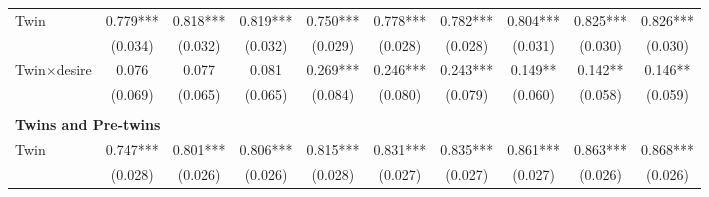 \begin{landscape}
\begin{table}[htpb!]
\begin{center}
\begin{tabular}{lccccccccc}
Twin&0.779***&0.818***&0.819***&0.750***&0.778***&0.782***&0.804***&0.825***&0.826***\\
&(0.034)&(0.032)&(0.032)&(0.029)&(0.028)&(0.028)&(0.031)&(0.030)&(0.030)\\
Twin$\times$desire&0.076&0.077&0.081&0.269***&0.246***&0.243***&0.149**&0.142**&0.146**\\
&(0.069)&(0.065)&(0.065)&(0.084)&(0.080)&(0.079)&(0.060)&(0.058)&(0.059)\\
\begin{footnotesize}\end{footnotesize}&\begin{footnotesize}\end{footnotesize}&\begin{footnotesize}\end{footnotesize}&\begin{footnotesize}\end{footnotesize}&\begin{footnotesize}\end{footnotesize}&\begin{footnotesize}\end{footnotesize}&\begin{footnotesize}\end{footnotesize}&\begin{footnotesize}\end{footnotesize}&\begin{footnotesize}\end{footnotesize}&\begin{footnotesize}\end{footnotesize}\\\multicolumn{10}{l}{\textbf{Twins and Pre-twins}}\\ 
Twin&0.747***&0.801***&0.806***&0.815***&0.831***&0.835***&0.861***&0.863***&0.868***\\
&(0.028)&(0.026)&(0.026)&(0.028)&(0.027)&(0.027)&(0.027)&(0.026)&(0.026)\\

\end{tabular}
\end{center}
\end{table}
\end{landscape}

